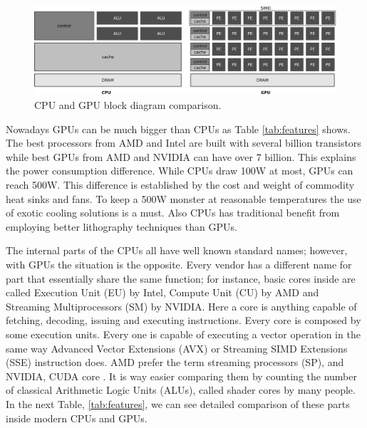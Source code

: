 \documentclass{article}
\begin{document}
\begin{figure}[!ht]
\centering
\includegraphics[width=\textwidth]{cpu-gpu.eps}
\caption{CPU and GPU block diagram comparison.}
\label{fig:cpu-gpu}
\end{figure}

Nowadays GPUs can be much bigger than CPUs as Table \ref{tab:features}
shows. The best processors from AMD and Intel are built with several
billion transistors while best GPUs from AMD and NVIDIA can have over
7 billion. This explains the power consumption difference. While CPUs
draw 100W at most, GPUs can reach 500W. This difference is established
by the cost and weight of commodity heat sinks and fans. To keep a
500W monster at reasonable temperatures the use of exotic cooling
solutions is a must. Also CPUs has traditional benefit from employing
better lithography techniques than GPUs.  %

The internal parts of the CPUs all have well known standard names;
however, with GPUs the situation is the opposite. Every vendor has a
different name for part that essentially share the same function; for
instance, basic cores %
inside are called Execution Unit (EU) by Intel, Compute Unit (CU) by
AMD and Streaming Multiprocessors (SM) by NVIDIA. Here a core is
anything capable of fetching, decoding, issuing and executing
instructions. Every core is composed by some execution units. Every one 
is capable of executing a vector operation in the same way Advanced Vector Extensions (AVX) or Streaming SIMD Extensions (SSE) instruction does. AMD prefer the term streaming processors (SP), and
NVIDIA, CUDA core \cite{YangCUDA15}. It is way easier comparing them by counting the
number of classical Arithmetic Logic Units (ALUs), called shader cores
by many people. In the next Table, \ref{tab:features}, we can see
detailed comparison of these parts inside modern CPUs and GPUs. 
\end{document}
